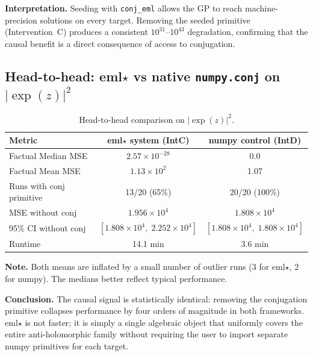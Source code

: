 \documentclass[11pt,a4paper]{article}
\begin{document}
\textbf{Interpretation.} Seeding with \texttt{conj\_eml} allows the GP to reach machine-precision solutions on every target. Removing the seeded primitive (Intervention~C) produces a consistent $10^{31}$--$10^{43}$ degradation, confirming that the causal benefit is a direct consequence of access to conjugation.

\subsection{Head-to-head: eml$\star$ vs native \texttt{numpy.conj} on $|\exp(z)|^2$}

\begin{table}[h]
\centering
\begin{tabular}{lcc}
\toprule
Metric & eml$\star$ system (IntC) & numpy control (IntD) \\
\midrule
Factual Median MSE & $2.57 \times 10^{-28}$ & 0.0 \\
Factual Mean MSE & $1.13 \times 10^{2}$ & 1.07 \\
Runs with conj primitive & 13/20 (65\%) & 20/20 (100\%) \\
MSE without conj & $1.956 \times 10^{4}$ & $1.808 \times 10^{4}$ \\
95\% CI without conj & $[1.808 \times 10^{4},\; 2.252 \times 10^{4}]$ & $[1.808 \times 10^{4},\; 1.808 \times 10^{4}]$ \\
Runtime & 14.1 min & 3.6 min \\
\bottomrule
\end{tabular}
\caption{Head-to-head comparison on $|\exp(z)|^2$.}
\end{table}

\textbf{Note.} Both means are inflated by a small number of outlier runs (3 for eml$\star$, 2 for numpy). The medians better reflect typical performance.

\textbf{Conclusion.} The causal signal is statistically identical: removing the conjugation primitive collapses performance by four orders of magnitude in both frameworks. eml$\star$ is not faster; it is simply a single algebraic object that uniformly covers the entire anti-holomorphic family without requiring the user to import separate numpy primitives for each target.

\end{document}
